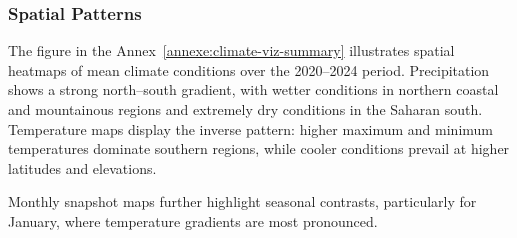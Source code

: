 \subsubsection{Spatial Patterns}

The figure in the Annex~\ref{annexe:climate-viz-summary} illustrates spatial heatmaps of mean climate conditions over the 2020–2024 period. Precipitation shows a strong north–south gradient, with wetter conditions in northern coastal and mountainous regions and extremely dry conditions in the Saharan south. Temperature maps display the inverse pattern: higher maximum and minimum temperatures dominate southern regions, while cooler conditions prevail at higher latitudes and elevations.

Monthly snapshot maps further highlight seasonal contrasts, particularly for January, where temperature gradients are most pronounced.
